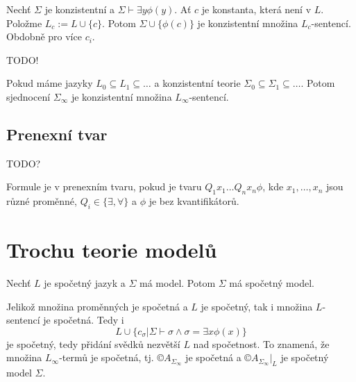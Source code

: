 \documentclass[12pt]{article}                   %
\begin{document}
        \begin{lemma}
            Nechť $\Sigma$ je konzistentní a $\Sigma \vdash \exists y\phi(y)$. Ať $c$ je konstanta, která není v $L$. Položme $L_c := L \cup \{c\}$. Potom $\Sigma \cup \{\phi(c)\}$ je konzistentní množina $L_c$-sentencí. Obdobně pro více $c_i$.
        \end{lemma}

        \begin{lemma}
            TODO!
        \end{lemma}

        \begin{lemma}
            Pokud máme jazyky $L_0 \subseteq L_1 \subseteq …$ a konzistentní teorie $\Sigma_0 \subseteq \Sigma_1 \subseteq …$. Potom sjednocení $\Sigma_{∞}$ je konzistentní množina $L_{∞}$-sentencí.
        \end{lemma}

    
    \subsection{Prenexní tvar}

        TODO?

        \begin{definice}
                Formule je v prenexním tvaru, pokud je tvaru $Q_1x_1…Q_nx_n\phi$, kde $x_1, …, x_n$ jsou různé proměnné, $Q_i \in \{\exists, \forall\}$ a $\phi$ je bez kvantifikátorů.
        \end{definice}


\section{Trochu teorie modelů}
    \begin{veta}
        Nechť $L$ je spočetný jazyk a $\Sigma$ má model. Potom $\Sigma$ má spočetný model.

        \begin{dukazin}
            Jelikož množina proměnných je spočetná a $L$ je spočetný, tak i množina $L$-sentencí je spočetná. Tedy i 
            $$ L \cup \{c_\sigma | \Sigma \vdash \sigma \land \sigma = \exists x \phi(x) \} $$ 
            je spočetný, tedy přidání svědků nezvětší $L$ nad spočetnost. To znamená, že množina $L_{∞}$-termů je spočetná, tj. $©A_{\Sigma_{∞}}$ je spočetná a $©A_{\Sigma_{∞}}|_L$ je spočetný model $\Sigma$.
        \end{dukazin}
    \end{veta}
\end{document}
